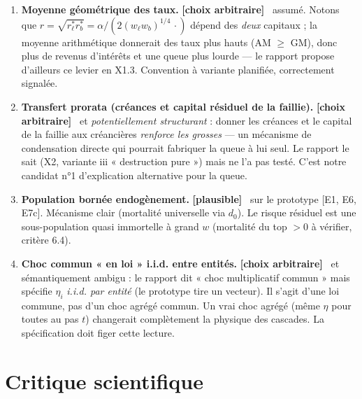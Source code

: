 \documentclass[11pt,a4paper]{article}
\newcommand{\NW}{\mathrm{NW}}
\newcommand{\plausible}[1]{\textbf{[plausible]}~#1}
\newcommand{\arbitraire}[1]{\textbf{[choix arbitraire]}~#1}
\begin{document}
\begin{enumerate}
  (les données de revenu de [YR] concernent $y$). Si le corps exponentiel
  n'apparaît que sur $\NW$ et pas sur $y$, la correspondance avec la
  littérature empirique s'affaiblit.
\item \textbf{Moyenne géométrique des taux.} \arbitraire{} assumé. Notons que
  $r = \sqrt{r^*_\ell r^*_b} = \alpha / (2 (w_\ell w_b)^{1/4}\,\cdot)$ dépend
  des \emph{deux} capitaux ; la moyenne arithmétique donnerait des taux plus
  hauts (AM $\ge$ GM), donc plus de revenus d'intérêts et une queue plus
  lourde — le rapport propose d'ailleurs ce levier en X1.3. Convention à
  variante planifiée, correctement signalée.
\item \textbf{Transfert prorata (créances et capital résiduel de la
  faillie).} \arbitraire{} et \emph{potentiellement structurant} : donner les
  créances et le capital de la faillie aux créancières \emph{renforce les
  grosses} — un mécanisme de condensation directe qui pourrait fabriquer la
  queue à lui seul. Le rapport le sait (X2, variante iii « destruction
  pure ») mais ne l'a pas testé. C'est notre candidat n°1 d'explication
  alternative pour la queue.
\item \textbf{Population bornée endogènement.} \plausible{} sur le prototype
  [E1, E6, E7c]. Mécanisme clair (mortalité universelle via $d_0$). Le risque
  résiduel est une sous-population quasi immortelle à grand $w$ (mortalité du
  top $> 0$ à vérifier, critère 6.4).
\item \textbf{Choc commun « en loi » i.i.d. entre entités.} \arbitraire{}
  et sémantiquement ambigu : le rapport dit « choc multiplicatif commun »
  mais spécifie $\eta_i$ \emph{i.i.d. par entité} (le prototype tire un
  vecteur). Il s'agit d'une loi commune, pas d'un choc agrégé commun. Un vrai
  choc agrégé (même $\eta$ pour toutes au pas $t$) changerait complètement la
  physique des cascades. La spécification doit figer cette lecture.
\end{enumerate}

\section{Critique scientifique}
\label{sec:critique}
\end{document}
